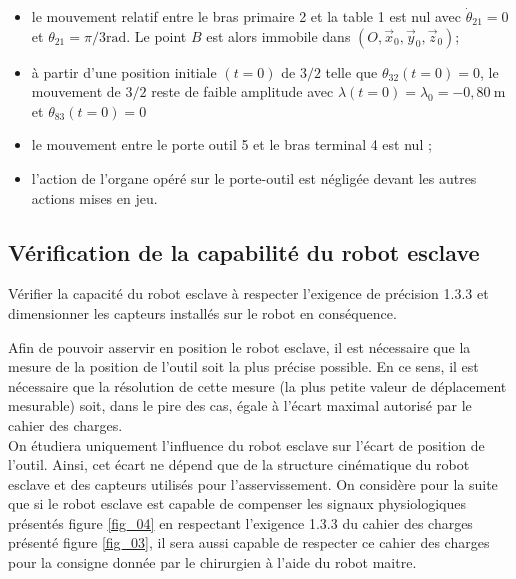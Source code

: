 \begin{itemize}
  \item le mouvement relatif entre le bras primaire 2 et la table 1 est nul avec $\dot{\theta}_{21}=0$ et $\theta_{21}=\pi / 3 \mathrm{rad}$. Le point $B$ est alors immobile dans $\left(O, \vec{x}_{0}, \vec{y}_{0}, \vec{z}_{0}\right)$;
  \item à partir d'une position initiale $(t=0)$ de $3 / 2$ telle que $\theta_{32}(t=0)=0$, le mouvement de $3 / 2$ reste de faible amplitude avec $\lambda(t=0)=\lambda_{0}=-0,80 \mathrm{~m}$ et $\theta_{83}(t=0)=0$
  \item le mouvement entre le porte outil 5 et le bras terminal 4 est nul ;
  \item l'action de l'organe opéré sur le porte-outil est négligée devant les autres actions mises en jeu.
\end{itemize}

\subsection{Vérification de la capabilité du robot esclave}
\begin{obj}
Vérifier la capacité du robot esclave à respecter l'exigence de précision 1.3.3 et dimensionner les capteurs installés sur le robot en conséquence.
\end{obj}

Afin de pouvoir asservir en position le robot esclave, il est nécessaire que la mesure de la position de l'outil soit la plus précise possible. En ce sens, il est nécessaire que la résolution de cette mesure (la plus petite valeur de déplacement mesurable) soit, dans le pire des cas, égale à l'écart maximal autorisé par le cahier des charges.\\
On étudiera uniquement l'influence du robot esclave sur l'écart de position de l'outil. Ainsi, cet écart ne dépend que de la structure cinématique du robot esclave et des capteurs utilisés pour l'asservissement. On considère pour la suite que si le robot esclave est capable de compenser les signaux physiologiques présentés figure \ref{fig_04} en respectant l'exigence 1.3.3 du cahier des charges présenté figure \ref{fig_03}, il sera aussi capable de respecter ce cahier des charges pour la consigne donnée par le chirurgien à l'aide du robot maitre.\\


